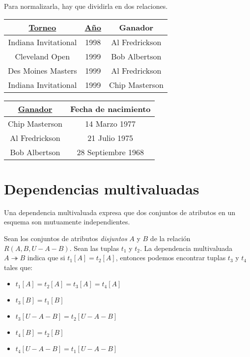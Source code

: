 \documentclass[a4paper, twoside]{article}
\begin{document}
Para normalizarla, hay que dividirla en dos relaciones.\\

\begin{minipage}{0.5\textwidth}
	\begin{center}
		\begin{tabular}{|c|c|c|}
			\hline 
			\uline{Torneo} & \uline{Año} & Ganador\\
			\hline 
			\hline 
			Indiana Invitational  & 1998 & Al Fredrickson \\
			\hline 
			Cleveland Open  & 1999 & Bob Albertson \\
			\hline 
			Des Moines Masters  & 1999 & Al Fredrickson \\
			\hline 
			Indiana Invitational  & 1999 & Chip Masterson \\
			\hline 
		\end{tabular}
	\end{center}
\end{minipage}
\begin{minipage}{0.5\textwidth}
	\begin{center}
		\begin{tabular}{|c|c|}
			\hline 
			\uline{Ganador} & Fecha de nacimiento\\
			\hline 
			\hline 
			Chip Masterson  & 14 Marzo 1977\\
			\hline 
			Al Fredrickson  & 21 Julio 1975\\
			\hline 
			Bob Albertson  & 28 Septiembre 1968\\
			\hline 
		\end{tabular}
	\end{center}
\end{minipage}

\section{Dependencias multivaluadas}
Una dependencia multivaluada expresa que dos conjuntos de atributos en un esquema son mutuamente independientes.

Sean los conjuntos de atributos \emph{disjuntos} $A$ y $B$ de la relación $R(A,B,U-A-B)$. Sean las tuplas $t_{1}$ y $t_{2}$. La dependencia multivaluada $A\twoheadrightarrow B$ indica que si $t_{1}[A]=t_{2}[A]$, entonces podemos encontrar tuplas $t_{3}$ y $t_{4}$ tales que:
\begin{itemize}
	\item $t_{1}[A]=t_{2}[A]=t_{3}[A]=t_{4}[A]$
	\item $t_{3}[B]=t_{1}[B]$
	\item $t_{3}[U-A-B]=t_{2}[U-A-B]$
	\item $t_{4}[B]=t_{2}[B]$
	\item $t_{4}[U-A-B]=t_{1}[U-A-B]$
\end{itemize}
\end{document}
